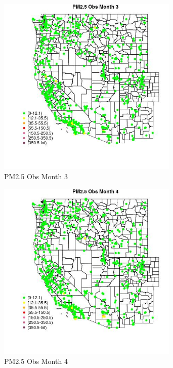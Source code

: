 \begin{figure} 
\centering  
\includegraphics[width=0.77\textwidth]{Code_Outputs/Report_ML_input_PM25_Step4_part_e_de_duplicated_aveswNAs_MapObsMo3PM25_Obs.jpg} 
\caption{\label{fig:Report_ML_input_PM25_Step4_part_e_de_duplicated_aveswNAsMapObsMo3PM25_Obs}PM2.5 Obs Month 3} 
\end{figure} 
 

\begin{figure} 
\centering  
\includegraphics[width=0.77\textwidth]{Code_Outputs/Report_ML_input_PM25_Step4_part_e_de_duplicated_aveswNAs_MapObsMo4PM25_Obs.jpg} 
\caption{\label{fig:Report_ML_input_PM25_Step4_part_e_de_duplicated_aveswNAsMapObsMo4PM25_Obs}PM2.5 Obs Month 4} 
\end{figure} 
 

